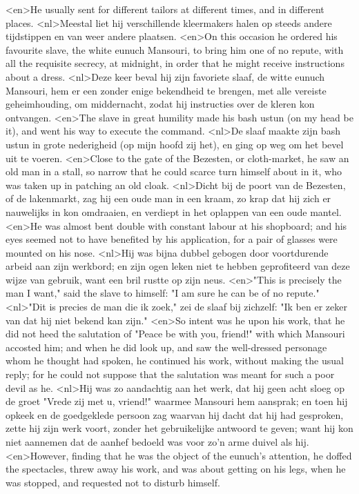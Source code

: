 <en>He usually sent for different tailors at different times, and in different places.
<nl>Meestal liet hij verschillende kleermakers halen op steeds andere tijdstippen en van weer andere plaatsen.
<en>On this occasion he ordered his favourite slave, the white eunuch Mansouri, to bring him one of no repute, with all the requisite secrecy, at midnight, in order that he might receive instructions about a dress.
<nl>Deze keer beval hij zijn favoriete slaaf, de witte eunuch Mansouri, hem er een zonder enige bekendheid te brengen, met alle vereiste geheimhouding, om middernacht, zodat hij instructies over de kleren kon ontvangen.
<en>The slave in great humility made his bash ustun (on my head be it), and went his way to execute the command.
<nl>De slaaf maakte zijn bash ustun  in grote nederigheid (op mijn hoofd zij het), en ging op weg om het bevel uit te voeren.
<en>Close to the gate of the Bezesten, or cloth-market, he saw an old man in a stall, so narrow that he could scarce turn himself about in it, who was taken up in patching an old cloak.
<nl>Dicht bij de poort van de Bezesten, of de lakenmarkt, zag hij een oude man in een kraam, zo krap dat hij zich er nauwelijks in kon omdraaien, en verdiept in het oplappen van een oude mantel.
<en>He was almost bent double with constant labour at his shopboard; and his eyes seemed not to have benefited by his application, for a pair of glasses were mounted on his nose.
<nl>Hij was bijna dubbel gebogen door voortdurende arbeid aan zijn werkbord; en zijn ogen leken niet te hebben geprofiteerd van deze wijze van gebruik, want een bril rustte op zijn neus.
<en>"This is precisely the man I want," said the slave to himself: "I am sure he can be of no repute."
<nl>"Dit is precies de man die ik zoek," zei de slaaf bij zichzelf: "Ik ben er zeker van dat hij niet bekend kan zijn."
<en>So intent was he upon his work, that he did not heed the salutation of "Peace be with you, friend!" with which Mansouri accosted him; and when he did look up, and saw the well-dressed personage whom he thought had spoken, he continued his work, without making the usual reply; for he could not suppose that the salutation was meant for such a poor devil as he.
<nl>Hij was zo  aandachtig aan het werk, dat hij geen acht sloeg op de groet "Vrede zij met u, vriend!" waarmee Mansouri hem aansprak; en toen hij opkeek en de goedgeklede persoon zag waarvan hij dacht dat hij had gesproken, zette hij zijn werk voort, zonder het gebruikelijke antwoord te geven; want hij kon niet aannemen dat de aanhef bedoeld was voor zo'n arme duivel als hij.
<en>However, finding that he was the object of the eunuch's attention, he doffed the spectacles, threw away his work, and was about getting on his legs, when he was stopped, and requested not to disturb himself.
